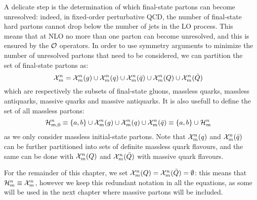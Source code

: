 A delicate step is the determination of which final-state partons can become unresolved: indeed, in fixed-order perturbative QCD, the number of final-state hard partons cannot drop below the number of jets in the LO process. This means that at NLO no more than one parton can become unresolved, and this is ensured by the $ \mathcal{O} $ operators. In order to use symmetry arguments to minimize the number of unresolved partons that need to be considered, we can partition the set of final-state partons as:
\begin{equation*}
  \mathcal{X}^{n}_{m} = \mathcal{X}^{n}_{m}(g) \cup \mathcal{X}^{n}_{m}(q) \cup \mathcal{X}^{n}_{m}(\bar{q}) \cup \mathcal{X}^{n}_{m}(Q) \cup \mathcal{X}^{n}_{m}(\bar{Q})
\end{equation*}
which are respectively the subsets of final-state gluons, massless quarks, massless antiquarks, massive quarks and massive antiquarks. It is also usefull to define the set of all massless partons:
\begin{equation*}
  \mathcal{H}^{n}_{m,0} \equiv \{a,b\} \cup \mathcal{X}^{n}_{m}(g) \cup \mathcal{X}^{n}_{m}(q) \cup \mathcal{X}^{n}_{m}(\bar{q}) \equiv \{a,b\} \cup \mathcal{H}^{n}_{m}
\end{equation*}
as we only consider massless initial-state partons. Note that $ \mathcal{X}^{n}_{m}(q) $ and $ \mathcal{X}^{n}_{m}(\bar{q}) $ can be further partitioned into sets of definite massless quark flavours, and the same can be done with $ \mathcal{X}^{n}_{m}(Q) $ and $ \mathcal{X}^{n}_{m}(\bar{Q}) $ with massive quark flavours.

For the remainder of this chapter, we set $ \mathcal{X}^{n}_{m}(Q) = \mathcal{X}^{n}_{m}(\bar{Q}) = \emptyset $: this means that $ \mathcal{H}^{n}_{m} \equiv \mathcal{X}^{n}_{m} $, however we keep this redundant notation in all the equations, as some will be used in the next chapter where massive partons will be included.


